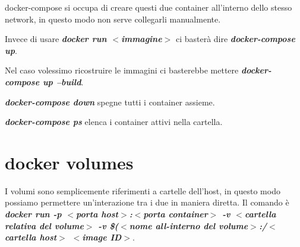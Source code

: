 \documentclass[11pt,a4paper]{book}
\begin{document}
docker-compose si occupa di creare questi due container all'interno dello stesso network, in questo modo non serve collegarli manualmente.

Invece di usare \emph{\textbf{docker run $<$immagine$>$}} ci basterà dire \emph{\textbf{docker-compose up}}.

Nel caso volessimo ricostruire le immagini ci basterebbe mettere \emph{\textbf{docker-compose up --build}}.


\emph{\textbf{docker-compose down}} spegne tutti i container assieme.

\emph{\textbf{docker-compose ps}} elenca i container attivi nella cartella.

\chapter{docker volumes}
I volumi sono semplicemente riferimenti a cartelle dell'host, in questo modo possiamo permettere un'interazione tra i due in maniera diretta. Il comando è \emph{\textbf{docker run -p $<$porta host$>$:$<$porta container$>$ -v $<$cartella relativa del volume$>$ -v \$($<$nome all-interno del volume$>$:/$<$cartella host$>$ $<$image ID$>$}}.
\end{document}
